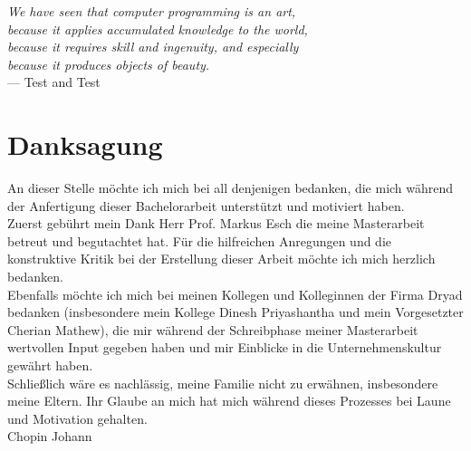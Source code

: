 
\begin{flushright}{\slshape
        We have seen that computer programming is an art, \\
        because it applies accumulated knowledge to the world, \\
        because it requires skill and ingenuity, and especially \\
        because it produces objects of beauty.} \\ \medskip
    --- Test \cite{bastienscapin} and Test \cite{usability}
\end{flushright}

\bigskip

\begingroup
\let\clearpage\relax
\let\cleardoublepage\relax
\let\cleardoublepage\relax
\chapter*{Danksagung}
An dieser Stelle möchte ich mich bei all denjenigen bedanken, die mich während der
Anfertigung dieser Bachelorarbeit unterstützt und motiviert haben.\\

Zuerst gebührt mein Dank Herr Prof. Markus Esch die
meine Masterarbeit betreut und begutachtet hat. Für die hilfreichen Anregungen und die
konstruktive Kritik bei der Erstellung dieser Arbeit möchte ich mich herzlich bedanken.\\

Ebenfalls möchte ich mich bei meinen Kollegen und Kolleginnen der Firma Dryad
bedanken (insbesondere mein Kollege Dinesh Priyashantha und mein Vorgesetzter Cherian Mathew), die mir während der Schreibphase meiner Masterarbeit wertvollen Input
gegeben haben und mir Einblicke in die Unternehmenskultur gewährt haben.\\

Schließlich wäre es nachlässig, meine Familie nicht zu erwähnen, insbesondere meine Eltern. Ihr Glaube an mich hat mich während dieses Prozesses bei Laune und Motivation gehalten.\\

Chopin Johann
\endgroup

